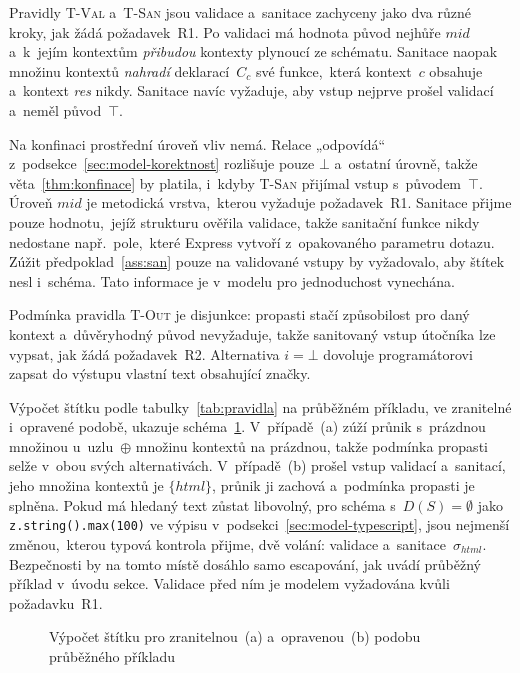 Pravidly \textsc{T-Val} a~\textsc{T-San} jsou validace a~sanitace zachyceny jako dva různé kroky, jak žádá požadavek~R1. Po validaci má hodnota původ nejhůře $\mathit{mid}$ a~k~jejím kontextům \emph{přibudou} kontexty plynoucí ze schématu. Sanitace naopak množinu kontextů \emph{nahradí} deklarací~$C_c$ své funkce,~která kontext~$c$ obsahuje a~kontext \emph{res} nikdy. Sanitace navíc vyžaduje, aby vstup nejprve prošel validací a~neměl původ~$\top$.

Na konfinaci prostřední úroveň vliv nemá. Relace „odpovídá“ z~podsekce~\ref{sec:model-korektnost} rozlišuje pouze $\bot$ a~ostatní úrovně, takže věta~\ref{thm:konfinace} by platila, i~kdyby \textsc{T-San} přijímal vstup s~původem~$\top$. Úroveň $\mathit{mid}$ je metodická vrstva,~kterou vyžaduje požadavek~R1. Sanitace přijme pouze hodnotu,~jejíž strukturu ověřila validace, takže sanitační funkce nikdy nedostane např.~pole,~které Express vytvoří z~opakovaného parametru dotazu. Zúžit předpoklad~\ref{ass:san} pouze na validované vstupy by vyžadovalo, aby štítek nesl i~schéma. Tato informace je v~modelu pro jednoduchost vynechána.

Podmínka pravidla \textsc{T-Out} je disjunkce: propasti stačí způsobilost pro daný kontext a~důvěryhodný původ nevyžaduje, takže sanitovaný vstup útočníka lze vypsat, jak žádá požadavek~R2. Alternativa $i = \bot$ dovoluje programátorovi zapsat do výstupu vlastní text obsahující značky.

Výpočet štítku podle tabulky~\ref{tab:pravidla} na průběžném příkladu, ve zranitelné i~opravené podobě, ukazuje schéma~\ref{fig:vypocet}. V~případě~(a) zúží průnik s~prázdnou množinou u~uzlu~$\oplus$ množinu kontextů na prázdnou, takže podmínka propasti selže v~obou svých alternativách. V~případě~(b) prošel vstup validací a~sanitací, jeho množina kontextů je $\{\mathit{html}\}$, průnik ji zachová a~podmínka propasti je splněna. Pokud má hledaný text zůstat libovolný, pro schéma s~$D(S) = \emptyset$ jako \texttt{z.string().max(100)} ve výpisu v~podsekci~\ref{sec:model-typescript}, jsou nejmenší změnou,~kterou typová kontrola přijme, dvě volání: validace a~sanitace~$\sigma_{\mathit{html}}$. Bezpečnosti by na tomto místě dosáhlo samo escapování, jak uvádí průběžný příklad v~úvodu sekce. Validace před ním je modelem vyžadována kvůli požadavku~R1.

\begin{figure}[htbp]
    \centering
    \caption{Výpočet štítku pro zranitelnou~(a) a~opravenou~(b) podobu průběžného příkladu}
    \label{fig:vypocet}
\end{figure}


